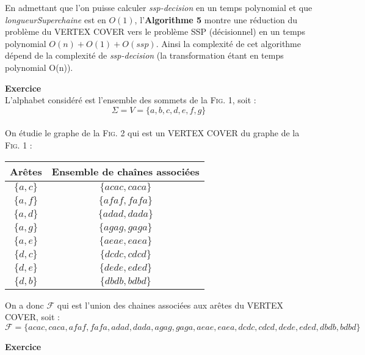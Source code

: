 \documentclass[11pt,letterpaper]{article}
\newcommand{\exo}[1]{\Large \textbf{Exercice \numprint{#1}} \vspace{10px} \normalsize}
\begin{document}
\vspace{10px}

En admettant que l'on puisse calculer \textit{ssp-decision} en un temps polynomial et que \textit{longueurSuperchaine} est en $O(1)$, l'\textbf{Algorithme 5} montre une réduction du problème du VERTEX COVER vers le problème SSP (décisionnel) en un temps polynomial $O(n)+O(1)+O(ssp)$. Ainsi la complexité de cet algorithme dépend de la complexité de \textit{ssp-decision} (la transformation étant en temps polynomial O(n)).

\vspace{20px}

\exo{5}\\

L'alphabet considéré est l'ensemble des sommets de la \textsc{Fig. 1}, soit :
$$\Sigma = V = \{a,b,c,d,e,f,g\}$$\\
On étudie le graphe de la \textsc{Fig. 2} qui est un VERTEX COVER du graphe de la \textsc{Fig. 1} :\\
\begin{center}
   \begin{tabular}{|c|c|}
    \hline
    \textbf{Arêtes} & \textbf{Ensemble de chaînes associées}\\
    \hline
    $\{a,c\}$ & $\{acac,caca\}$\\
    \hline
    $\{a,f\}$ & $\{afaf,fafa\}$\\
    \hline
    $\{a,d\}$ & $\{adad,dada\}$\\
    \hline
    $\{a,g\}$ & $\{agag,gaga\}$\\
    \hline
    $\{a,e\}$ & $\{aeae,eaea\}$\\
    \hline
    $\{d,c\}$ & $\{dcdc,cdcd\}$\\
    \hline
    $\{d,e\}$ & $\{dede,eded\}$\\
    \hline
    $\{d,b\}$ & $\{dbdb,bdbd\}$\\
    \hline
\end{tabular} 
\end{center}

\vspace{12px}

On a donc $\mathcal{F}$ qui est l'union des chaines associées aux arêtes du VERTEX COVER, soit :
\vspace{-4px}
$$\mathcal{F} = \{acac,caca,afaf,fafa,adad,dada,agag,gaga,aeae,eaea,dcdc,cdcd,dede,eded,dbdb,bdbd\}$$

\newpage

\exo{6}\\
\end{document}
